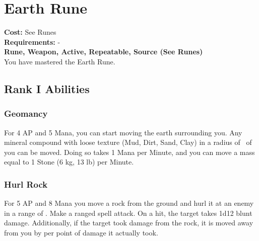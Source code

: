 \section{Earth Rune}\label{rune:earth}
\textbf{Cost:} See Runes\\
\textbf{Requirements:} -\\
\textbf{Rune, Weapon, Active, Repeatable, Source (See Runes)}\\
You have mastered the Earth Rune.

\subsection{Rank I Abilities}

\subsubsection{Geomancy}
For 4 AP and 5 Mana, you can start moving the earth surrounding you.
Any mineral compound with loose texture (Mud, Dirt, Sand, Clay) in a radius of~ of you can be moved.
Doing so takes 1 Mana per Minute, and you can move a mass equal to 1 Stone (6 kg, 13 lb) per Minute.

\subsubsection{Hurl Rock}
For 5 AP and 8 Mana you move a rock from the ground and hurl it at an enemy in a range of .
Make a ranged spell attack.
On a hit, the target takes 1d12 blunt damage.
Additionally, if the target took damage from the rock, it is moved away from you by  per point of damage it actually took.
